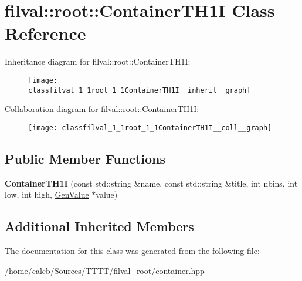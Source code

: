 \hypertarget{classfilval_1_1root_1_1ContainerTH1I}{}\section{filval\+:\+:root\+:\+:Container\+T\+H1I Class Reference}
\label{classfilval_1_1root_1_1ContainerTH1I}


Inheritance diagram for filval\+:\+:root\+:\+:Container\+T\+H1I\+:
\nopagebreak
\begin{figure}[H]
\begin{center}
\leavevmode
\texttt{[image: classfilval\_1\_1root\_1\_1ContainerTH1I\_\_inherit\_\_graph]}
\end{center}
\end{figure}


Collaboration diagram for filval\+:\+:root\+:\+:Container\+T\+H1I\+:
\nopagebreak
\begin{figure}[H]
\begin{center}
\leavevmode
\texttt{[image: classfilval\_1\_1root\_1\_1ContainerTH1I\_\_coll\_\_graph]}
\end{center}
\end{figure}
\subsection*{Public Member Functions}
\begin{DoxyCompactItemize}
\item 
\hypertarget{classfilval_1_1root_1_1ContainerTH1I_ae0ffd1cceb726c21a1593bfea5a8f566}{}\label{classfilval_1_1root_1_1ContainerTH1I_ae0ffd1cceb726c21a1593bfea5a8f566} 
{\bfseries Container\+T\+H1I} (const std\+::string \&name, const std\+::string \&title, int nbins, int low, int high, \hyperlink{classfilval_1_1GenValue}{Gen\+Value} $\ast$value)
\end{DoxyCompactItemize}
\subsection*{Additional Inherited Members}


The documentation for this class was generated from the following file\+:\begin{DoxyCompactItemize}
\item 
/home/caleb/\+Sources/\+T\+T\+T\+T/filval\+\_\+root/container.\+hpp\end{DoxyCompactItemize}
